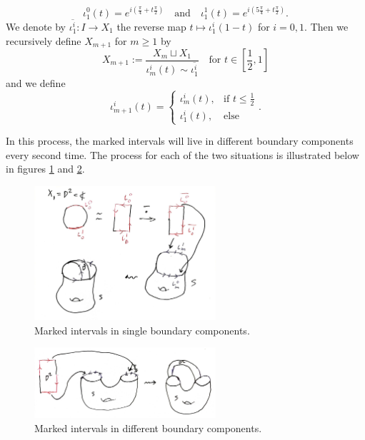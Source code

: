 \documentclass[reqno]{amsart}
\theoremstyle{definition}
\theoremstyle{remark}
\begin{document}
    \[
    \iota_1^{0} (t) =
    e^{i \left( \frac{\pi}{4} + t \frac{\pi}{2} \right) }
    \quad
    \text{and}
    \quad
    \iota_{1}^{1} (t) = e^{i \left( 5 \frac{\pi}{4} +
    t \frac{\pi}{2} \right) }.
    \] 
    We denote by
    $\overline{\iota_1^{i}} \colon
    I \to X_1$ the reverse map
    $t \mapsto \iota_{1}^{i}(1-t)$ for $i = 0,1$.
    Then we recursively define $X_{m+1}$ for 
    $m\ge 1$ by
    \[
    X_{m+1} :=
    \frac{X_m \sqcup X_1}{\iota_m^{i}(t) 
\sim \overline{\iota_1^{i}}} \quad \text{for } t
\in \left[ \frac{1}{2},1 \right]
    \] 
    and we define
    \[
    \iota_{m+1}^{i} (t) 
    =
    \begin{cases}
        \iota_m^{i}(t),& \text{if } t \le \frac{1}{2}\\
        \iota_1^{i}(t),& \text{else}
    \end{cases}.
    \] 

    In this process, the marked intervals will live in
    different boundary components every second time. 
    The process for each of the two situations is illustrated below
    in figures
    \ref{fig:bidecorated-attaching-jpeg} and
    \ref{fig:bidecorated-second-attaching-jpeg}.


\begin{figure}[H]
    \centering
    \includegraphics[width=0.6\textwidth]{bidecorated-attaching.jpeg}
    \caption{Marked intervals in single boundary components.}
    \label{fig:bidecorated-attaching-jpeg}
\end{figure}

\begin{figure}[H]
    \centering
    \includegraphics[width=0.6\textwidth]{bidecorated-second-attaching.jpeg}
    \caption{Marked intervals in different boundary components.}
    \label{fig:bidecorated-second-attaching-jpeg}
\end{figure}
\end{document}
